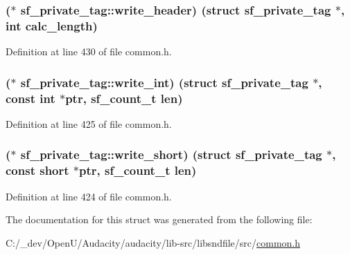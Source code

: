 \subsubsection[{\texorpdfstring{write\+\_\+header}{write_header}}]{($\ast$ sf\+\_\+private\+\_\+tag\+::write\+\_\+header) (struct {\bf sf\+\_\+private\+\_\+tag} $\ast$, {\bf int} calc\+\_\+length)}\hypertarget{structsf__private__tag_a41db5f9e03f8f5ab24bce4534b3c1c98}{}\label{structsf__private__tag_a41db5f9e03f8f5ab24bce4534b3c1c98}


Definition at line 430 of file common.\+h.

\subsubsection[{\texorpdfstring{write\+\_\+int}{write_int}}]{($\ast$ sf\+\_\+private\+\_\+tag\+::write\+\_\+int) (struct {\bf sf\+\_\+private\+\_\+tag} $\ast$, {\bf const} {\bf int} $\ast$ptr, {\bf sf\+\_\+count\+\_\+t} {\bf len})}\hypertarget{structsf__private__tag_ac8ef0841aefa0fb9ac22b1045dc713f7}{}\label{structsf__private__tag_ac8ef0841aefa0fb9ac22b1045dc713f7}


Definition at line 425 of file common.\+h.

\subsubsection[{\texorpdfstring{write\+\_\+short}{write_short}}]{($\ast$ sf\+\_\+private\+\_\+tag\+::write\+\_\+short) (struct {\bf sf\+\_\+private\+\_\+tag} $\ast$, {\bf const} short $\ast$ptr, {\bf sf\+\_\+count\+\_\+t} {\bf len})}\hypertarget{structsf__private__tag_a5445a02635d3ab4a3256621954b0114e}{}\label{structsf__private__tag_a5445a02635d3ab4a3256621954b0114e}


Definition at line 424 of file common.\+h.



The documentation for this struct was generated from the following file\+:\begin{DoxyCompactItemize}
\item 
C\+:/\+\_\+dev/\+Open\+U/\+Audacity/audacity/lib-\/src/libsndfile/src/\hyperlink{libsndfile_2src_2common_8h}{common.\+h}\end{DoxyCompactItemize}
